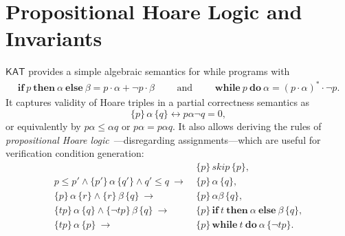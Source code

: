 \documentclass[envcountsame,envcountsect]{llncs}
\newcommand{\IF}[3]{\mathbf{if}\ #1\ \mathbf{then}\ #2\ \mathbf{else}\ #3}
\newcommand{\WHILE}[2]{\mathbf{while}\ #1\ \mathbf{do}\ #2}
\newcommand{\sskip}{\mathit{skip}}
\newcommand{\KAT}{\mathsf{KAT}}
\begin{document}

\section{Propositional Hoare Logic and Invariants}\label{sec:hl-invariants}

$\KAT$ provides a simple algebraic semantics for while
programs with
\begin{align*}
  \IF{p}{\alpha}{\beta} = p\cdot \alpha + \neg p \cdot
  \beta\qquad\text{ and }\qquad
\WHILE{p}{\alpha} = (p\cdot \alpha)^\ast \cdot \neg p.
\end{align*}
It captures validity of Hoare triples in
a partial correctness semantics as
\begin{equation*}
  \{p\}\, \alpha\, \{q\} \leftrightarrow p\alpha\neg q = 0,
\end{equation*}
or equivalently by $p\alpha\le \alpha q$ or $p\alpha = p\alpha q$. It
also allows deriving the rules of \emph{propositional Hoare
  logic}~\cite{Kozen00}---disregarding assignments---which are useful for
verification condition generation:
\begin{align}
  &\{p\}\, \sskip\, \{p\}, \label{eq:h-skip}\tag{h-skip}\\
  p\le p' \land \{p'\}\, \alpha\, \{q'\} \land q'\le q\ \rightarrow\ &
                                                                       \{p\}\,
                                                                       \alpha\,
                                                                       \{q\},\label{eq:h-cons}\tag{h-cons}\\
  \{p\}\, \alpha\, \{r\} \land \{r\}\, \beta\, \{q\}\ \rightarrow\
  &\{p\}\, \alpha\beta\, \{q\},\label{eq:h-seq}\tag{h-seq}\\
  \{tp\}\, \alpha\, \{q\}\land \{\neg tp\}\, \beta\, \{q\}\
  \rightarrow\ & \{p\}\, \IF{t}{\alpha}{\beta}\, \{q\},\label{eq:h-cond}\tag{h-cond}\\
  \{tp\}\, \alpha\, \{p\}\ \rightarrow\ & \{p\}\, \WHILE{t}{\alpha}\, \{\neg tp\}.\label{eq:h-while}\tag{h-while}
\end{align}
\end{document}
